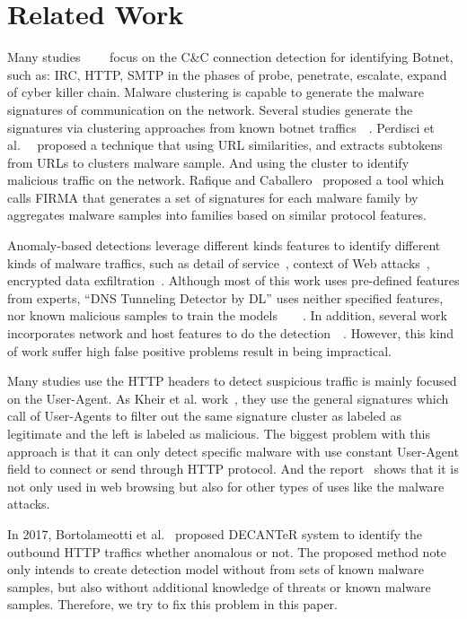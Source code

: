 \section{Related Work}

Many studies~\cite{feily2009survey}~\cite{barford2007inside}~\cite{strayer2008botnet}~\cite{atluri2017botnets} focus on the C\&C connection detection for identifying Botnet, such as: IRC, HTTP, SMTP in the phases of probe, penetrate, escalate, expand of cyber killer chain. Malware clustering is capable to generate the malware signatures of communication on the network. Several studies generate the signatures via clustering approaches from known botnet traffics~\cite{p:zarras14}~\cite{nelms2013execscent}. Perdisci et al.~\cite{perdisci2013scalable}~\cite{perdisci2010behavioral} proposed a technique that using URL similarities, and extracts subtokens from URLs to clusters malware sample. And using the cluster to identify malicious traffic on the network. Rafique and Caballero~\cite{rafique2013firma} proposed a tool which calls FIRMA that generates a set of signatures for each malware family by aggregates malware samples into families based on similar protocol features.  

Anomaly-based detections leverage different kinds features to identify different kinds of malware traffics, such as detail of service~\cite{p:feinstein03}, context of Web attacks~\cite{p:krugel03}, encrypted data exfiltration~\cite{p:he14}.  Although most of this work uses pre-defined features from experts,  “DNS Tunneling Detector by DL” uses neither specified features, nor  known malicious samples to train the models~\cite{j:zhang16}~\cite{bilge2012disclosure}~\cite{gu2008botminer}~\cite{binkley2006algorithm}.  In addition, several work incorporates network and host features to do the detection~\cite{p:schwenk11}~\cite{borders2004web}.  However, this kind of work suffer high false positive problems result in being impractical.  

Many studies use the HTTP headers to detect suspicious traffic is mainly focused on the User-Agent. As Kheir et al. work~\cite{kheir2013behavioral}, they use the general signatures which call of User-Agents to filter out the same signature cluster as labeled as legitimate and the left is labeled as malicious. The biggest problem with this approach is that it can only detect specific malware with use constant User-Agent field to connect or send through HTTP protocol. And the report~\cite{bartos2016optimized} shows that it is not only used in web browsing but also for other types of uses like the malware attacks.

In 2017, Bortolameotti et al.~\cite{bortolameotti2017decanter} proposed DECANTeR system to identify the outbound HTTP traffics whether anomalous or not.   The proposed method note only intends to create detection model without from sets of known malware samples, but also without additional knowledge of threats or known malware samples. Therefore, we try to fix this problem in this paper. 